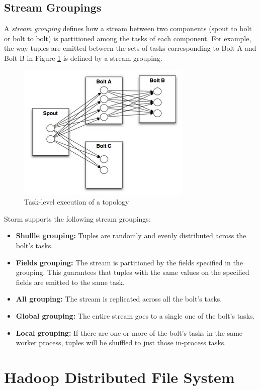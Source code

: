 \subsection{Stream Groupings}

A \emph{stream grouping} defines how a stream between two components (spout to bolt or bolt to bolt) is partitioned among the tasks of each component. For example, the way tuples are emitted between the sets of tasks corresponding to Bolt A and Bolt B in Figure \ref{figure:storm_groupings} is defined by a stream grouping.

\begin{figure}[h!]
\centering
\includegraphics{figures/storm_groupings}
\caption{Task-level execution of a topology}
\label{figure:storm_groupings}
\end{figure}

Storm supports the following stream groupings:
\begin{itemize}
\item \textbf{Shuffle grouping:} Tuples are randomly and evenly distributed across the bolt's tasks.
\item \textbf{Fields grouping:} The stream is partitioned by the fields specified in the grouping. This guarantees that tuples with the same values on the specified fields are emitted to the same task.
\item \textbf{All grouping:} The stream is replicated across all the bolt's tasks.
\item \textbf{Global grouping:} The entire stream goes to a single one of the bolt's tasks.
\item \textbf{Local grouping:} If there are one or more of the bolt's tasks in the same worker process, tuples will be shuffled to just those in-process tasks.
\end{itemize}


\section{Hadoop Distributed File System}

